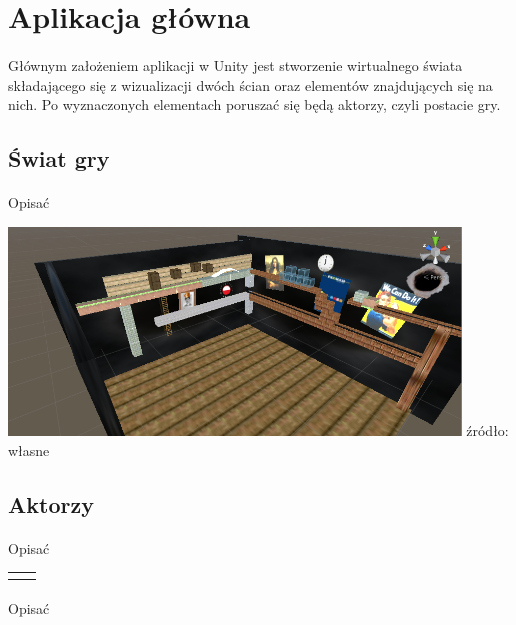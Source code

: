 \newpage
\section{Aplikacja główna}
\paragraph{}
Głównym założeniem aplikacji w Unity jest stworzenie wirtualnego świata składającego się z wizualizacji dwóch ścian oraz elementów znajdujących się na nich. Po wyznaczonych elementach poruszać się będą aktorzy, czyli postacie gry.

\subsection{Świat gry}
\paragraph{}
{\color{red}Opisać}

\begin{center}
\includegraphics[width=0.9\textwidth]{images/swiatgry.png}
\small {źródło: własne }
\end{center}


\subsection{Aktorzy}
\paragraph{}
{\color{red}Opisać}


\begin{center}

 \begin{tabular}{|c|c|}
 \hline  
  &   \\
  \hline   
  &   \\
  \hline   
\end{tabular}
\paragraph{}
{\color{red}Opisać}
\end{center}

